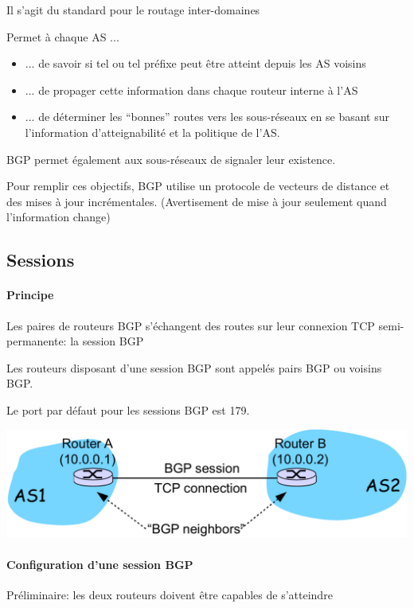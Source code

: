 \documentclass{article}
\begin{document}
\begin{sffamily}
Il s'agit du standard pour le routage inter-domaines

Permet à chaque AS ...

\begin{itemize}
\item ... de savoir si tel ou tel préfixe peut être atteint depuis les
  AS voisins
\item ... de propager cette information dans chaque routeur interne à
  l'AS
\item ... de déterminer les ``bonnes'' routes vers les sous-réseaux en
  se basant sur l'information d'atteignabilité et la politique de
  l'AS.
\end{itemize}

BGP permet également aux sous-réseaux de signaler leur existence.

Pour remplir ces objectifs, BGP utilise un protocole de vecteurs de
distance et des mises à jour incrémentales. (Avertisement de mise à
jour seulement quand l'information change)

\subsection{Sessions}

\paragraph{Principe}

Les paires de routeurs BGP s'échangent des routes sur leur connexion
TCP semi-permanente: la session BGP

Les routeurs disposant d'une session BGP sont appelés pairs BGP ou
voisins BGP.

Le port par défaut pour les sessions BGP est 179.

\includegraphics[width=\textwidth]{fab_001.pdf}

\paragraph{Configuration d'une session BGP}

Préliminaire: les deux routeurs doivent être capables de s'atteindre


\end{sffamily}
\end{document}
